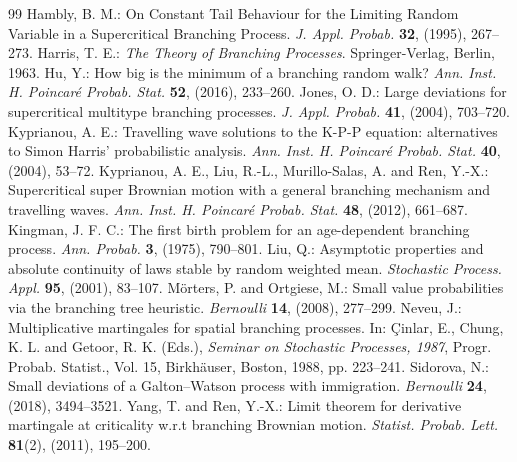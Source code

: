 \documentclass[10pt,a4paper]{amsart}
\numberwithin{equation}{section}
\begin{document}
\begin{thebibliography}{99}
 Hambly, B. M.: On Constant Tail Behaviour for the Limiting Random Variable in a Supercritical Branching Process. \emph{J. Appl. Probab.} \textbf{32}, (1995), 267--273.
 Harris, T. E.: \emph{The Theory of Branching Processes}. Springer-Verlag, Berlin, 1963.
 Hu, Y.: How big is the minimum of a branching random walk? \emph{Ann. Inst. H. Poincar\'e Probab. Stat.} \textbf{52}, (2016), 233--260.
 Jones, O. D.: Large deviations for supercritical multitype branching processes. \emph{J. Appl. Probab.} \textbf{41}, (2004), 703--720.
 Kyprianou, A. E.: Travelling wave solutions to the K-P-P equation: alternatives to Simon Harris' probabilistic analysis. \emph{Ann. Inst. H. Poincar\'e Probab. Stat.} \textbf{40}, (2004), 53--72.
 Kyprianou, A. E., Liu, R.-L., Murillo-Salas, A. and Ren, Y.-X.: Supercritical super Brownian motion with a general branching mechanism and travelling waves. \emph{Ann. Inst. H. Poincar\'e Probab. Stat.} \textbf{48}, (2012), 661--687.
 Kingman, J. F. C.: The first birth problem for an age-dependent branching process. \emph{Ann. Probab.} \textbf{3}, (1975), 790--801.
 Liu, Q.: Asymptotic properties and absolute continuity of laws stable by random weighted mean. \emph{Stochastic Process. Appl.} \textbf{95}, (2001), 83--107.
 M\"orters, P. and Ortgiese, M.: Small value probabilities via the branching tree heuristic. \emph{Bernoulli} \textbf{14}, (2008), 277--299.
 Neveu, J.: Multiplicative martingales for spatial branching processes. In: \c{C}inlar, E., Chung, K. L. and Getoor, R. K. (Eds.), \emph{Seminar on Stochastic Processes, 1987}, Progr. Probab. Statist., Vol. 15, Birkh\"auser, Boston, 1988, pp. 223--241.
 Sidorova, N.: Small deviations of a Galton--Watson process with immigration. \emph{Bernoulli} \textbf{24}, (2018), 3494--3521.
 Yang, T. and Ren, Y.-X.: Limit theorem for derivative martingale at criticality w.r.t branching Brownian motion. \emph{Statist. Probab. Lett.} \textbf{81}(2), (2011), 195--200.
\end{thebibliography}
\end{document}
